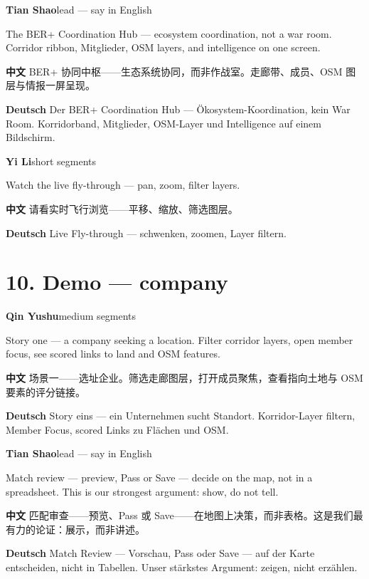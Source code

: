 \documentclass[11pt,a4paper]{ctexart}
\newenvironment{speakerblock}[2]{%
  \par\medskip
  {\color{berblue}\textbf{#1}}\hfill{\small\textcolor{bergrey}{#2}}\par
  \vspace{0.25em}
}{\par\medskip}
\begin{document}
\begin{speakerblock}{Tian Shao}{lead — say in English}
\begin{englishbox}
The BER+ Coordination Hub — ecosystem coordination, not a war room. Corridor ribbon, Mitglieder, OSM layers, and intelligence on one screen.
\end{englishbox}

\textbf{中文} BER+ 协同中枢——生态系统协同，而非作战室。走廊带、成员、OSM 图层与情报一屏呈现。

\textbf{Deutsch} Der BER+ Coordination Hub — Ökosystem-Koordination, kein War Room. Korridorband, Mitglieder, OSM-Layer und Intelligence auf einem Bildschirm.
\end{speakerblock}


\begin{speakerblock}{Yi Li}{short segments}
\begin{englishbox}
Watch the live fly-through — pan, zoom, filter layers.
\end{englishbox}

\textbf{中文} 请看实时飞行浏览——平移、缩放、筛选图层。

\textbf{Deutsch} Live Fly-through — schwenken, zoomen, Layer filtern.
\end{speakerblock}



\section{10. Demo — company}

\begin{speakerblock}{Qin Yushu}{medium segments}
\begin{englishbox}
Story one — a company seeking a location. Filter corridor layers, open member focus, see scored links to land and OSM features.
\end{englishbox}

\textbf{中文} 场景一——选址企业。筛选走廊图层，打开成员聚焦，查看指向土地与 OSM 要素的评分链接。

\textbf{Deutsch} Story eins — ein Unternehmen sucht Standort. Korridor-Layer filtern, Member Focus, scored Links zu Flächen und OSM.
\end{speakerblock}


\begin{speakerblock}{Tian Shao}{lead — say in English}
\begin{englishbox}
Match review — preview, Pass or Save — decide on the map, not in a spreadsheet. This is our strongest argument: show, do not tell.
\end{englishbox}

\textbf{中文} 匹配审查——预览、Pass 或 Save——在地图上决策，而非表格。这是我们最有力的论证：展示，而非讲述。

\textbf{Deutsch} Match Review — Vorschau, Pass oder Save — auf der Karte entscheiden, nicht in Tabellen. Unser stärkstes Argument: zeigen, nicht erzählen.
\end{speakerblock}
\end{document}

